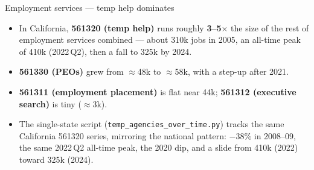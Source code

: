 \documentclass[aspectratio=169,10pt]{beamer}
\begin{document}
\begin{frame}{Employment services --- temp help dominates}
  \begin{itemize}
    \item In California, \textbf{561320 (temp help)} runs roughly
          \textbf{3--5$\times$} the size of the rest of employment services
          combined --- about \num{310}k jobs in 2005, an all-time peak of
          \num{410}k (2022\,Q2), then a fall to \num{325}k by 2024.
    \item \textbf{561330 (PEOs)} grew from \(\approx\)\num{48}k to \(\approx\)\num{58}k,
          with a step-up after 2021.
    \item \textbf{561311 (employment placement)} is flat near \num{44}k;
          \textbf{561312 (executive search)} is tiny (\(\approx\)\num{3}k).
    \item The single-state script (\texttt{temp\_agencies\_over\_time.py}) tracks
          the same California 561320 series, mirroring the national pattern:
          $-38\%$ in 2008--09, the same 2022\,Q2 all-time peak, the 2020 dip,
          and a slide from \num{410}k (2022) toward \num{325}k (2024).
  \end{itemize}
\end{frame}

\end{document}
